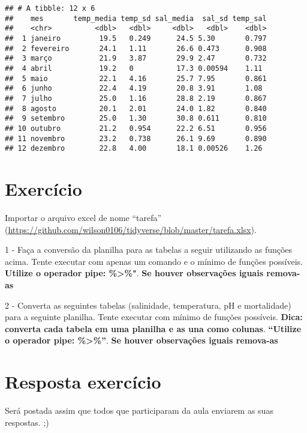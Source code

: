 \documentclass[]{book}
\begin{document}
\begin{verbatim}
## # A tibble: 12 x 6
##    mes       temp_media temp_sd sal_media  sal_sd temp_sal
##    <chr>          <dbl>   <dbl>     <dbl>   <dbl>    <dbl>
##  1 janeiro         19.5   0.249      24.5 5.30       0.797
##  2 fevereiro       24.1   1.11       26.6 0.473      0.908
##  3 março           21.9   3.87       29.9 2.47       0.732
##  4 abril           19.2   0          17.3 0.00594    1.11 
##  5 maio            22.1   4.16       25.7 7.95       0.861
##  6 junho           22.4   4.19       20.8 3.91       1.08 
##  7 julho           25.0   1.16       28.8 2.19       0.867
##  8 agosto          20.1   2.01       24.0 1.82       0.840
##  9 setembro        25.0   1.30       30.8 0.611      0.810
## 10 outubro         21.2   0.954      22.2 6.51       0.956
## 11 novembro        23.2   0.738      26.1 9.69       0.890
## 12 dezembro        22.8   4.00       18.1 0.00526    1.26
\end{verbatim}

\hypertarget{exercuxedcio}{%
\chapter{Exercício}\label{exercuxedcio}}

Importar o arquivo excel de nome ``tarefa'' (\url{https://github.com/wilson0106/tidyverse/blob/master/tarefa.xlsx}).

1 - Faça a conversão da planilha para as tabelas a seguir utilizando as funções acima. Tente executar com apenas um comando e o mínimo de funções possíveis. \textbf{Utilize o operador pipe: \%\textgreater{}\%"}. \textbf{Se houver observações iguais remova-as}

2 - Converta as seguintes tabelas (salinidade, temperatura, pH e mortalidade) para a seguinte planilha. Tente executar com mínimo de funções possíveis. \textbf{Dica: converta cada tabela em uma planilha e as una como colunas}. \textbf{``Utilize o operador pipe: \%\textgreater{}\%''}. \textbf{Se houver observações iguais remova-as}

\hypertarget{resposta-exercuxedcio}{%
\chapter{Resposta exercício}\label{resposta-exercuxedcio}}

Será postada assim que todos que participaram da aula enviarem as suas respostas. ;)
\end{document}
